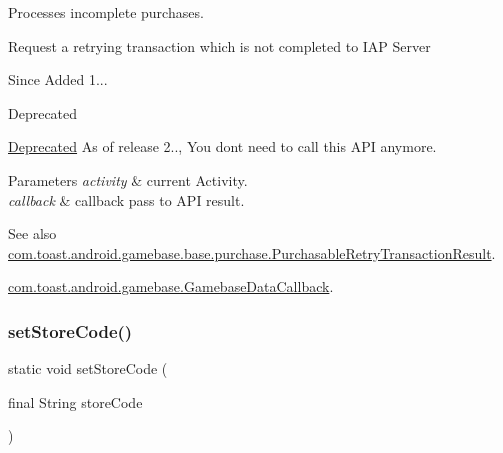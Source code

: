 Processes incomplete purchases. 

Request a retrying transaction which is not completed to I\+AP Server

\begin{DoxySince}{Since}
Added 1... 
\end{DoxySince}
\begin{DoxyRefDesc}{Deprecated}
\item[\hyperlink{deprecated__deprecated000004}{Deprecated}]As of release 2.., You don\textquotesingle{}t need to call this A\+PI anymore. \end{DoxyRefDesc}

\begin{DoxyParams}{Parameters}
{\em activity} & current Activity. \\
\hline
{\em callback} & callback pass to A\+PI result. \\
\hline
\end{DoxyParams}
\begin{DoxySeeAlso}{See also}
\hyperlink{classcom_1_1toast_1_1android_1_1gamebase_1_1base_1_1purchase_1_1_purchasable_retry_transaction_result}{com.\+toast.\+android.\+gamebase.\+base.\+purchase.\+Purchasable\+Retry\+Transaction\+Result}. 

\hyperlink{interfacecom_1_1toast_1_1android_1_1gamebase_1_1_gamebase_data_callback}{com.\+toast.\+android.\+gamebase.\+Gamebase\+Data\+Callback}. 
\end{DoxySeeAlso}
\mbox{\label{classcom_1_1toast_1_1android_1_1gamebase_1_1_gamebase_1_1_purchase_a8933fcc2fc156c87feee53efadfa4bb0}} 
\subsubsection{\texorpdfstring{set\+Store\+Code()}{setStoreCode()}}
{\footnotesize\ttfamily static void set\+Store\+Code (\begin{DoxyParamCaption}\item[{final String}]{store\+Code }\end{DoxyParamCaption})\hspace{0.3cm}{\ttfamily [static]}}



